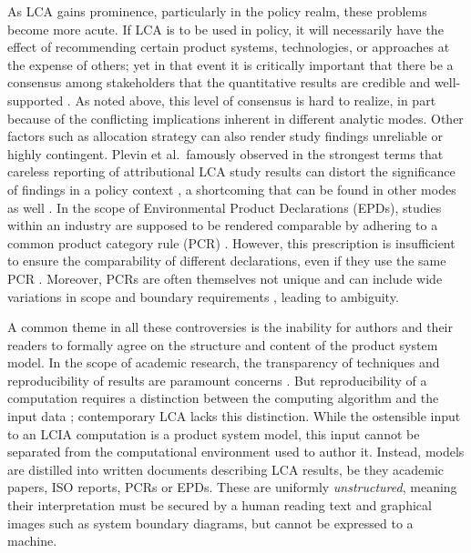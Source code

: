 As LCA gains prominence, particularly in the policy realm, these problems become more acute.  If LCA is to be used in policy, it will necessarily have the effect of recommending certain product systems, technologies, or approaches at the expense of others; yet in that event it is critically important that there be a consensus among stakeholders that the quantitative results are credible and well-supported \citep{Rainville_2015, McManus_2015}.  As noted above, this level of consensus is hard to realize, in part because of the conflicting implications inherent in different analytic modes.
Other factors such as allocation strategy \citep{Pelletier_2014} can also render study findings unreliable or highly contingent.  Plevin et al.\ famously observed in the strongest terms that careless reporting of attributional LCA study results can distort the significance of findings in a policy context \citep{Plevin_2013}, a shortcoming that can be found in other modes as well \citep{Brandao_2014}.  In the scope of Environmental Product Declarations (EPDs), studies within an industry are supposed to be rendered comparable by adhering to a common product category rule (PCR) \citep{Fet_2006}.  However, this prescription is insufficient to ensure the comparability of different declarations, even if they use the same PCR \citep{Modahl_2012}.  Moreover, PCRs are often themselves not unique and can include wide variations in scope and boundary requirements \citep{Subramanian_2012}, leading to ambiguity.  %

A common theme in all these controversies is the inability for authors and their readers to formally agree on the structure and content of the product system model.  In the scope of academic research, the transparency of techniques and reproducibility of results are paramount concerns \citep{Mesirov_2010}.  But reproducibility of a computation requires a distinction between the computing algorithm and the input data \citep{Buckheit_1995, Fomel_2009}; contemporary LCA lacks this distinction.  While the ostensible input to an LCIA computation is a product system model, this input cannot be separated from the computational environment used to author it.  Instead, models are distilled into written documents describing LCA results, be they academic papers, ISO reports, PCRs or EPDs.  These are uniformly \textit{unstructured}, meaning their interpretation must be secured by a human reading text and graphical images such as system boundary diagrams, but cannot be expressed to a machine.  

